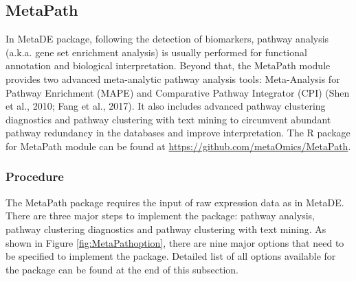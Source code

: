 \subsection{MetaPath}

In MetaDE package,
following the detection of biomarkers, pathway analysis (a.k.a. gene set enrichment analysis) is usually performed for functional annotation and biological interpretation. 
Beyond that, the MetaPath module provides two advanced meta-analytic pathway analysis tools: 
Meta-Analysis for Pathway Enrichment (MAPE) and Comparative Pathway Integrator (CPI) (Shen et al., 2010; Fang et al., 2017). 
It also includes advanced pathway clustering diagnostics and pathway clustering with text mining to circumvent abundant pathway redundancy in the databases and improve interpretation. 
The R package for MetaPath module can be found at \url{https://github.com/metaOmics/MetaPath}.

\subsubsection{Procedure}
The MetaPath package requires the input of raw expression data as in MetaDE. 
There are three major steps to implement the package: pathway analysis, pathway clustering diagnostics and pathway clustering with text mining. 
As shown in Figure \ref{fig:MetaPathoption}, there are nine major options that need to be specified to implement the package.
Detailed list of all options available for the package can be found at the end of this subsection. 


